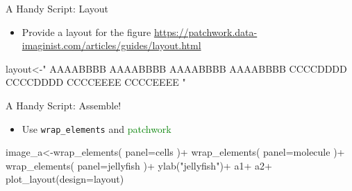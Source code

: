 \documentclass[
  ignorenonframetext,
]{beamer}
\newenvironment{Shaded}{\begin{snugshade}}{\end{snugshade}}
\newcommand{\AttributeTok}[1]{\textcolor[rgb]{0.40,0.45,0.13}{#1}}
\newcommand{\FunctionTok}[1]{\textcolor[rgb]{0.28,0.35,0.67}{#1}}
\newcommand{\NormalTok}[1]{\textcolor[rgb]{0.00,0.23,0.31}{#1}}
\newcommand{\OtherTok}[1]{\textcolor[rgb]{0.00,0.23,0.31}{#1}}
\newcommand{\SpecialCharTok}[1]{\textcolor[rgb]{0.37,0.37,0.37}{#1}}
\newcommand{\StringTok}[1]{\textcolor[rgb]{0.13,0.47,0.30}{#1}}
\providecommand{\tightlist}{%
  \setlength{\itemsep}{0pt}\setlength{\parskip}{0pt}}\usepackage{longtable,booktabs,array}
\begin{document}
\begin{frame}[fragile]{A Handy Script: Layout}
\protect\hypertarget{a-handy-script-layout}{}
\begin{itemize}[<+->]
\tightlist
\item
  Provide a layout for the figure
  \url{https://patchwork.data-imaginist.com/articles/guides/layout.html}
\end{itemize}

\pause

\footnotesize

\begin{Shaded}
\begin{Highlighting}[]
\NormalTok{                        layout}\OtherTok{\textless{}{-}}\StringTok{"}
\StringTok{                        AAAABBBB}
\StringTok{                        AAAABBBB}
\StringTok{                        AAAABBBB}
\StringTok{                        AAAABBBB}
\StringTok{                        CCCCDDDD}
\StringTok{                        CCCCDDDD}
\StringTok{                        CCCCEEEE}
\StringTok{                        CCCCEEEE}
\StringTok{                        "}
\end{Highlighting}
\end{Shaded}
\end{frame}

\begin{frame}[fragile]{A Handy Script: Assemble!}
\protect\hypertarget{a-handy-script-assemble}{}
\begin{itemize}[<+->]
\tightlist
\item
  Use \texttt{wrap\_elements} and \textcolor{green}{{patchwork}}
\end{itemize}

\footnotesize

\begin{Shaded}
\begin{Highlighting}[]
\NormalTok{                image\_a}\OtherTok{\textless{}{-}}\FunctionTok{wrap\_elements}\NormalTok{(}
                    \AttributeTok{panel=}\NormalTok{cells}
\NormalTok{                )}\SpecialCharTok{+}
                    \FunctionTok{wrap\_elements}\NormalTok{(}
                        \AttributeTok{panel=}\NormalTok{molecule}
\NormalTok{                    )}\SpecialCharTok{+}
                    \FunctionTok{wrap\_elements}\NormalTok{(}
                        \AttributeTok{panel=}\NormalTok{jellyfish}
\NormalTok{                    )}\SpecialCharTok{+}
                    \FunctionTok{ylab}\NormalTok{(}\StringTok{"jellyfish"}\NormalTok{)}\SpecialCharTok{+}
\NormalTok{                    a1}\SpecialCharTok{+}
\NormalTok{                    a2}\SpecialCharTok{+}
                    \FunctionTok{plot\_layout}\NormalTok{(}\AttributeTok{design=}\NormalTok{layout)}
\end{Highlighting}
\end{Shaded}

\normalsize
\end{frame}
\end{document}
